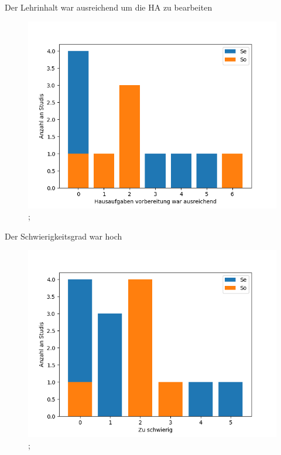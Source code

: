 \documentclass[10pt]{beamer}
\begin{document}
\begin{frame}[fragile]{Der Lehrinhalt war ausreichend um die HA zu bearbeiten} 
 \begin{figure}
 \includegraphics[width= 0.9\linewidth]{./PDFcreater/Plots/Nx/Der+Lehrinhalt+war+ausreichend+um+die+HA+zu+bearbeiten.png};
 \end{figure}
 \end{frame}
\begin{frame}[fragile]{Der Schwierigkeitsgrad war hoch} 
 \begin{figure}
 \includegraphics[width= 0.9\linewidth]{./PDFcreater/Plots/Nx/Der+Schwierigkeitsgrad+war+hoch.png};
 \end{figure}
 \end{frame}
\end{document}
